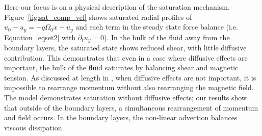\documentclass{emulateapj}
\begin{document}
Here our focus is on a physical description of the saturation mechanism. Figure~\ref{fig:sat_comp_vel} shows saturated radial profiles of $u_0 - u_{y} = -q \Omega_0 x - u_{y}$ and each term in the steady state force balance (i.e. Equation~\ref{eqset2} with $\partial_t u_{y} = 0$). In the bulk of the fluid away from the boundary layers, the saturated state shows reduced shear, with little diffusive contribution. This demonstrates that even in a case where diffusive effects are important, the bulk of the fluid saturates by balancing shear and magnetic tension. As discussed at length in \citet{Vasil:2015}, when diffusive effects are not important, it is impossible to rearrange momentum without also rearranging the magnetic field. The \citet{Vasil:2015} model demonstrates saturation without diffusive effects; our results show that outside of the boundary layers, a simultaneous rearrangement of momentum and field occurs. In the boundary layers, the non-linear advection balances viscous dissipation. 
\end{document}
